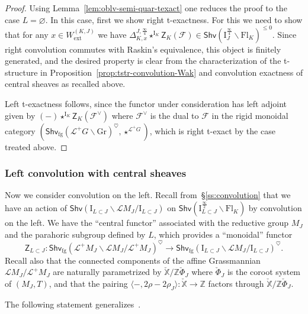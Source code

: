\documentclass[11pt]{amsart}
\numberwithin{equation}{section}
\theoremstyle{plain}
\theoremstyle{definition}
\newcommand{\sF}{{\mathcal F}}
\newcommand{\I}{{\mathrm I}}
\newcommand{\sL}{{\mathcal L}}
\newcommand{\X}{{\mathbb X}}
\newcommand{\Xd}{\check{\X}}
\newcommand{\Z}{{\mathbb Z}}
\newcommand{\semi}{{{\frac{\infty}{2}}}}
\newcommand{\quar}{{{\frac{\infty}{4}}}}
\newcommand{\ex}{\mathrm{ext}}
\newcommand{\Shv}{\mathsf{Shv}}
\newcommand{\Shvfg}{\mathsf{Shv}_{\mathrm{fg}}}
\newcommand{\Fl}{\mathrm{Fl}}
\newcommand{\Gr}{\mathrm{Gr}}
\newcommand{\ZCen}{\mathsf{Z}}
\begin{document}
\begin{proof}
Using Lemma~\ref{lem:oblv-semi-quar-texact} one reduces the proof to the case $L=\varnothing$.
In this case, first we show right t-exactness. For this we need to show that for any $x \in W_\ex^{(K,J)}$ we have $\Delta^{J,\quar}_{K,x} \star^{\I_K} \ZCen_K(\sF) \in \Shv \left( \I_{J}^\quar \backslash \Fl_K \right)^{\leq 0}$. Since right convolution commutes with Raskin's equivalence, this object is finitely generated, and the desired property is clear from the characterization of the t-structure in Proposition~\ref{prop:tstr-convolution-Wak} and convolution exactness of central sheaves as recalled above.

Left t-exactness follows, since the functor under consideration has left adjoint given by $(-) \star^{\I_K} \ZCen_K(\sF^\vee)$ where $\sF^\vee$ is the dual to $\sF$ in the rigid monoidal category $(\Shvfg(\sL^+G \backslash \Gr)^\heartsuit, \star^{\sL^+ G})$, which is right t-exact by the case treated above.
\end{proof}

\subsubsection{Left convolution with central sheaves}

Now we consider convolution on the left. Recall from~\S\ref{ss:convolution} that we have an action of $\Shv \left( \I_{L \subset J} \backslash \sL M_J / \I_{L \subset J} \right)$ on $\Shv \left( \I_{L \subset J}^\semi \backslash \Fl_K \right)$ by convolution on the left. We have the ``central functor'' associated with the reductive group $M_J$ and the parahoric subgroup defined by $L$, which provides a ``monoidal'' functor
\begin{equation}
\label{eqn:ZCen-MJ}
\ZCen_{L \subset J} : \Shvfg(\sL^+ M_J \backslash \sL M_J / \sL^+ M_J)^\heartsuit \to \Shvfg \left( \I_{L \subset J} \backslash \sL M_J / \I_{L \subset J} \right)^\heartsuit.
\end{equation}
Recall also that the connected components of the affine Grassmannian $\sL M_J / \sL^+ M_J$ are naturally parametrized by $\Xd / \Z \check{\Phi}_J$ where $\check{\Phi}_J$ is the coroot system of $(M_J,T)$, and that the pairing $\langle -,2\rho-2\rho_J \rangle : \Xd \to \Z$ factors through $\Xd / \Z \check{\Phi}_J$.

The following statement generalizes~\cite[Proposition~3.3.20(ii)]{DL23}.
\end{document}
